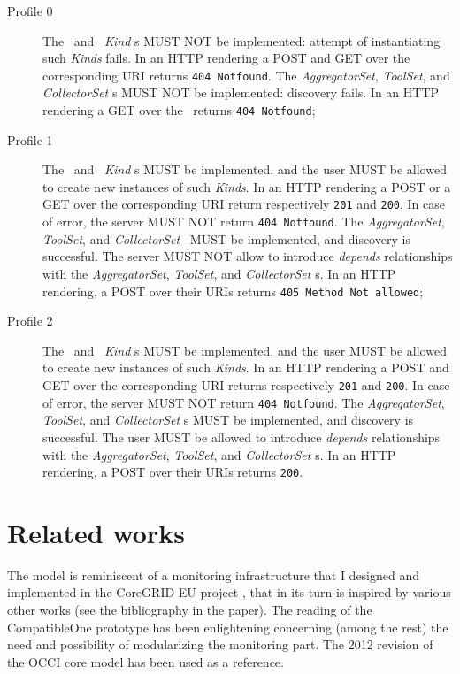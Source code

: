 \documentclass[12pt]{article}  %
\begin{document}
\begin{description}

\item[Profile 0] The \coll\ and \sens\ {\em Kind} s MUST NOT be implemented: attempt of instantiating such {\em Kinds} fails.  In an HTTP rendering a POST and GET over the corresponding URI returns {\tt 404 Notfound}. The {\em AggregatorSet}, {\em ToolSet}, and {\em CollectorSet} \mi s MUST NOT be implemented: discovery fails. In an HTTP rendering a GET over the \mi\ returns {\tt 404 Notfound}; 

\item[Profile 1] The \coll\ and \sens\ {\em Kind} s MUST be implemented, and the user MUST be allowed to create new instances of such {\em Kinds}.  In an HTTP rendering a POST or a GET over the corresponding URI return respectively {\tt 201} and {\tt 200}. In case of error, the server MUST NOT return {\tt 404 Notfound}. The {\em AggregatorSet}, {\em ToolSet}, and {\em CollectorSet} \mi\ MUST be implemented, and discovery is successful. The server MUST NOT allow to introduce {\em depends} relationships with the {\em AggregatorSet}, {\em ToolSet}, and {\em CollectorSet} \mi s. In an HTTP rendering, a POST over their URIs returns {\tt 405 Method Not allowed}; 

\item[Profile 2]  The \coll\ and \sens\ {\em Kind} s MUST be implemented, and the user MUST be allowed to create new instances of such {\em Kinds}.  In an HTTP rendering a POST and GET over the corresponding URI returns respectively {\tt 201} and {\tt 200}. In case of error, the server MUST NOT return {\tt 404 Notfound}. The {\em AggregatorSet}, {\em ToolSet}, and {\em CollectorSet} \mi s MUST be implemented, and discovery is successful. The user MUST be allowed to introduce {\em depends} relationships with the  {\em AggregatorSet}, {\em ToolSet}, and {\em CollectorSet} \mi s. In an HTTP rendering, a POST over their URIs returns {\tt 200}.

\end{description}

\section{Related works}

The model is reminiscent of a monitoring infrastructure that I designed and implemented in the CoreGRID EU-project \cite{cur:08:a}, that in its turn is inspired by various other works (see the bibliography in the paper). The reading of the CompatibleOne prototype \cite{mar12a} has been enlightening concerning (among the rest) the need and possibility of modularizing the monitoring part. The 2012 revision of the OCCI core model \cite{occi:core} has been used as a reference.
\end{document}

